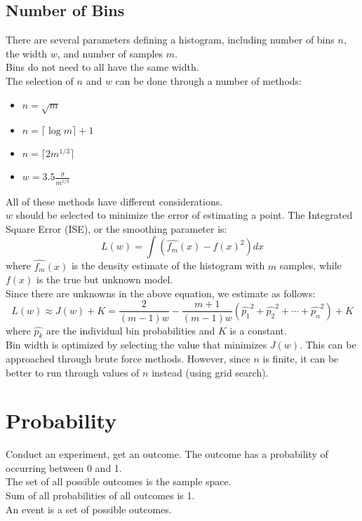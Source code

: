 \documentclass[nobib]{tufte-handout}
\begin{document}
\subsection{Number of Bins}
There are several parameters defining a histogram, including number of bins
$n$, the width $w$, and number of samples $m$.\\ Bins do not need to all have
the same width.\\ The selection of $n$ and $w$ can be done through a number of
methods:
\begin{itemize}
    \item $n = \sqrt{m}$
    \item $n = \lceil \log m \rceil + 1$
    \item $n = \lceil 2m^{1/3} \rceil$
    \item $w = 3.5 \frac{\hat{\sigma}}{m^{1/3}}$
\end{itemize}
All of these methods have different considerations.\\
$w$ should be selected to minimize the error of estimating a point.
The Integrated Square Error (ISE), or the smoothing parameter is:
\begin{equation*}
    L(w) = \int (\hat{f_m}(x)-f(x)^2)dx
\end{equation*}
where $\hat{f_m}(x)$ is the density estimate of the histogram with $m$ samples, while $f(x)$ is the true but unknown model.\\
Since there are unknowns in the above equation, we estimate as follows:
\begin{equation*}
    L(w)\approx J(w) + K = \frac{2}{(m-1)w}-\frac{m+1}{(m-1)w}(\hat{p_1}^2+\hat{p_2}^2+\cdots+\hat{p_n}^2) +K
\end{equation*}
where $\hat{p_k}$ are the individual bin probabilities and $K$ is a constant. \\
Bin width is optimized by selecting the value that minimizes $J(w)$. This can be approached through brute force methods. However, since $n$ is finite, it can be better to run through values of $n$ instead (using grid search).
\section{Probability}
Conduct an experiment, get an outcome.
The outcome has a probability of occurring between 0 and 1.\\
The set of all possible outcomes is the sample space.\\
Sum of all probabilities of all outcomes is 1.\\
An event is a set of possible outcomes.\\
\end{document}
